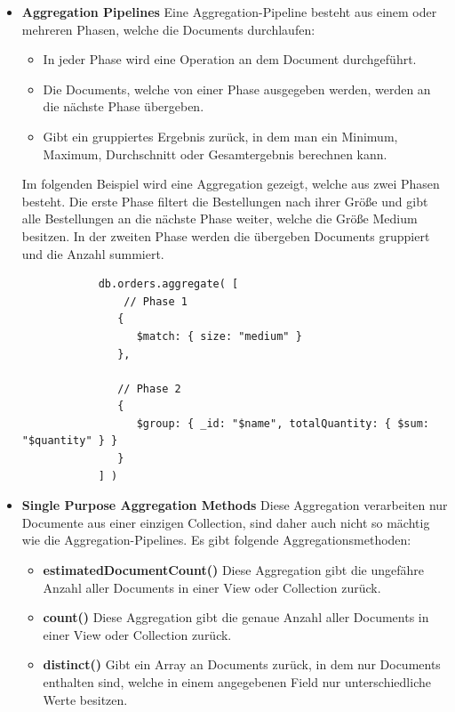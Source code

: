 \begin{itemize}
    \item \textbf{Aggregation Pipelines}
        \newline
         Eine Aggregation-Pipeline besteht aus einem oder mehreren Phasen, welche die Documents durchlaufen:
        \begin{itemize}
            \item In jeder Phase wird eine Operation an dem Document durchgeführt.
            \item Die Documents, welche von einer Phase ausgegeben werden, werden an die nächste Phase übergeben.
            \item Gibt ein gruppiertes Ergebnis zurück, in dem man ein Minimum, Maximum, Durchschnitt oder Gesamtergebnis berechnen kann.
        \end{itemize}
        Im folgenden Beispiel wird eine Aggregation gezeigt, welche aus zwei Phasen besteht. Die erste Phase filtert die Bestellungen nach ihrer Größe und gibt alle Bestellungen an die nächste Phase weiter, welche die Größe Medium besitzen. In der zweiten Phase werden die übergeben Documents gruppiert und die Anzahl summiert.
        \newpage
        \begin{lstlisting}
            db.orders.aggregate( [
                // Phase 1
               {
                  $match: { size: "medium" }
               },
            
               // Phase 2
               {
                  $group: { _id: "$name", totalQuantity: { $sum: "$quantity" } }
               }
            ] )
        \end{lstlisting}
    \item \textbf{Single Purpose Aggregation Methods}
        \newline
        Diese Aggregation verarbeiten nur Documente aus einer einzigen Collection, sind daher auch nicht so mächtig wie die Aggregation-Pipelines. Es gibt folgende Aggregationsmethoden:
        \begin{itemize}
            \item \textbf{estimatedDocumentCount()}
                \newline
                Diese Aggregation gibt die ungefähre Anzahl aller Documents in einer View oder Collection zurück.
            \item \textbf{count()}
                \newline
                Diese Aggregation gibt die genaue Anzahl aller Documents in einer View oder Collection zurück.
            \item \textbf{distinct()}
                \newline
                Gibt ein Array an Documents zurück, in dem nur Documents enthalten sind, welche in einem angegebenen Field nur unterschiedliche Werte besitzen.
        \end{itemize}
\end{itemize}
